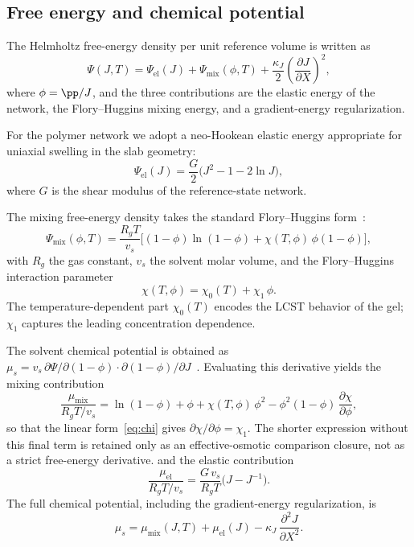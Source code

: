 \subsection{Free energy and chemical potential}

The Helmholtz free-energy density per unit reference volume is written as
\begin{equation}
  \Psi(J,T) = \Psi_\mathrm{el}(J) + \Psi_\mathrm{mix}(\phi,T)
  + \frac{\kappa_J}{2}\left(\frac{\partial J}{\partial X}\right)^2,
  \label{eq:Psi}
\end{equation}
where $\phi = \pp/J$, and the three contributions are the elastic
energy of the network, the Flory--Huggins mixing energy, and a
gradient-energy regularization.

For the polymer network we adopt a neo-Hookean elastic energy
appropriate for uniaxial swelling in the slab geometry:
\begin{equation}
  \Psi_\mathrm{el}(J) = \frac{G}{2}
  \bigl(J^{2} - 1 - 2\ln J\bigr),
  \label{eq:Psi_el}
\end{equation}
where $G$ is the shear modulus of the reference-state network.

The mixing free-energy density takes the standard Flory--Huggins
form~\cite{Flory1953}:
\begin{equation}
  \Psi_\mathrm{mix}(\phi,T)
  = \frac{R_g T}{v_s}
  \Big[(1-\phi)\ln(1-\phi) + \chi(T,\phi)\,\phi(1-\phi)\Big],
  \label{eq:Psi_mix}
\end{equation}
with $R_g$ the gas constant, $v_s$ the solvent molar volume, and
the Flory--Huggins interaction parameter
\begin{equation}
  \chi(T,\phi) = \chi_0(T) + \chi_1\,\phi.
  \label{eq:chi}
\end{equation}
The temperature-dependent part $\chi_0(T)$ encodes the LCST
behavior of the gel; $\chi_1$ captures the leading
concentration dependence.

The solvent chemical potential is obtained as
$\mu_s = v_s\,\partial\Psi/\partial(1-\phi)\cdot
\partial(1-\phi)/\partial J$~\cite{Hong2008}.  Evaluating this
derivative yields the mixing contribution
\begin{equation}
  \frac{\mu_\mathrm{mix}}{R_g T/v_s}
  = \ln(1-\phi) + \phi + \chi(T,\phi)\,\phi^2
  - \phi^2(1-\phi)\,\frac{\partial\chi}{\partial\phi},
  \label{eq:mu_mix}
\end{equation}
so that the linear form~\eqref{eq:chi} gives
$\partial\chi/\partial\phi=\chi_1$.  The shorter expression without
this final term is retained only as an effective-osmotic comparison
closure, not as a strict free-energy derivative.
and the elastic contribution
\begin{equation}
  \frac{\mu_\mathrm{el}}{R_g T/v_s}
  = \frac{G\,v_s}{R_g T}
  \bigl(J - J^{-1}\bigr).
  \label{eq:mu_el}
\end{equation}
The full chemical potential, including the gradient-energy
regularization, is
\begin{equation}
  \mu_s = \mu_\mathrm{mix}(J,T) + \mu_\mathrm{el}(J)
  - \kappa_J\,\frac{\partial^2 J}{\partial X^2}.
  \label{eq:mu_s}
\end{equation}

